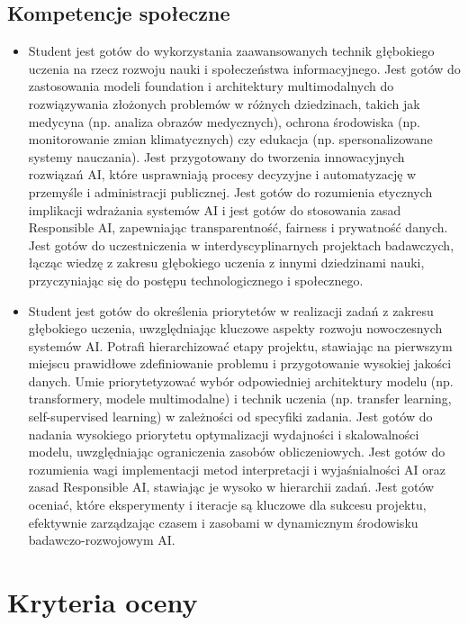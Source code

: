 \documentclass[12pt, a4paper]{article}
\begin{document}
\subsection*{Kompetencje społeczne}
\begin{itemize}
  \item Student jest gotów do wykorzystania zaawansowanych technik głębokiego uczenia na rzecz rozwoju nauki i społeczeństwa informacyjnego. Jest gotów do zastosowania modeli foundation i architektury multimodalnych do rozwiązywania złożonych problemów w różnych dziedzinach, takich jak medycyna (np. analiza obrazów medycznych), ochrona środowiska (np. monitorowanie zmian klimatycznych) czy edukacja (np. spersonalizowane systemy nauczania). Jest przygotowany do tworzenia innowacyjnych rozwiązań AI, które usprawniają procesy decyzyjne i automatyzację w przemyśle i administracji publicznej. Jest gotów do rozumienia etycznych implikacji wdrażania systemów AI i jest gotów do stosowania zasad Responsible AI, zapewniając transparentność, fairness i prywatność danych. Jest gotów do uczestniczenia w interdyscyplinarnych projektach badawczych, łącząc wiedzę z zakresu głębokiego uczenia z innymi dziedzinami nauki, przyczyniając się do postępu technologicznego i społecznego.
  \item Student jest gotów do określenia priorytetów w realizacji zadań z zakresu głębokiego uczenia, uwzględniając kluczowe aspekty rozwoju nowoczesnych systemów AI. Potrafi hierarchizować etapy projektu, stawiając na pierwszym miejscu prawidłowe zdefiniowanie problemu i przygotowanie wysokiej jakości danych. Umie priorytetyzować wybór odpowiedniej architektury modelu (np. transformery, modele multimodalne) i technik uczenia (np. transfer learning, self-supervised learning) w zależności od specyfiki zadania. Jest gotów do nadania wysokiego priorytetu optymalizacji wydajności i skalowalności modelu, uwzględniając ograniczenia zasobów obliczeniowych. Jest gotów do rozumienia wagi implementacji metod interpretacji i wyjaśnialności AI oraz zasad Responsible AI, stawiając je wysoko w hierarchii zadań. Jest gotów oceniać, które eksperymenty i iteracje są kluczowe dla sukcesu projektu, efektywnie zarządzając czasem i zasobami w dynamicznym środowisku badawczo-rozwojowym AI.
\end{itemize}

\section{Kryteria oceny}
\end{document}
